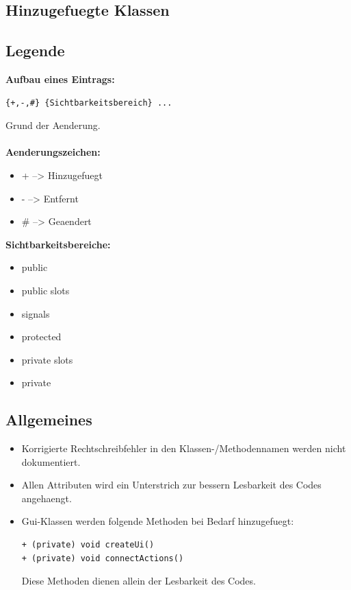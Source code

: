 \documentclass{scrartcl}
\begin{document}
{\subsection{Hinzugefuegte Klassen}













\subsection{Legende}
\textbf{Aufbau eines Eintrags:}
\begin{verbatim}
{+,-,#} {Sichtbarkeitsbereich} ...
\end{verbatim}
Grund der Aenderung.\\
\\
\textbf{Aenderungszeichen:}
\begin{itemize}
\item[] + \hspace{5mm}-->\hspace{5mm} Hinzugefuegt
\item[] - \hspace{5mm}-->\hspace{5mm} Entfernt
\item[] \# \hspace{5mm}-->\hspace{5mm} Geaendert
\end{itemize}
\textbf{Sichtbarkeitsbereiche:}
\begin{itemize}
\item public
\item public slots
\item signals
\item protected
\item private slots
\item private
\end{itemize}
\newpage
\subsection{Allgemeines}
\begin{itemize}
\item Korrigierte Rechtschreibfehler in den Klassen-/Methodennamen werden nicht dokumentiert.
\item Allen Attributen wird ein Unterstrich zur bessern Lesbarkeit des Codes angehaengt.
\item Gui-Klassen werden folgende Methoden bei Bedarf hinzugefuegt:
\begin{verbatim}
+ (private) void createUi()
+ (private) void connectActions()
\end{verbatim}
Diese Methoden dienen allein der Lesbarkeit des Codes.


\end{itemize}}
\end{document}
